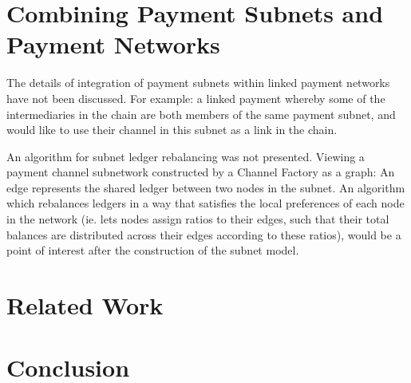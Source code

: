 \documentclass[12pt]{article}
\begin{document}
\section{Combining Payment Subnets and Payment Networks}

The details of integration of payment subnets within linked payment networks have not been discussed. For example: a linked payment whereby some of the intermediaries in the chain are both members of the same payment subnet, and would like to use their channel in this subnet as a link in the chain.

An algorithm for subnet ledger rebalancing was not presented. Viewing a payment channel subnetwork constructed by a Channel Factory as a graph: An edge represents the shared ledger between two nodes in the subnet. An algorithm which rebalances ledgers in a way that satisfies the local preferences of each node in the network (ie. lets nodes assign ratios to their edges, such that their total balances are distributed across their edges according to these ratios), would be a point of interest after the construction of the subnet model.

\section{Related Work}
\section{Conclusion}



\end{document}

